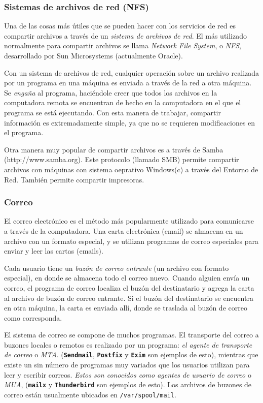 \documentclass[12pt]{article}
\begin{document}
\subsubsection{ Sistemas de archivos de red (NFS)}  

Una de las cosas
más útiles que se pueden hacer con los servicios de red es compartir archivos a
través de un \textit{sistema de archivos de red}. El más utilizado
normalmente para compartir archivos se llama \textit{Network File
System}, o \textit{NFS}, desarrollado por Sun Microsystems (actualmente Oracle).  

 Con un sistema de archivos de red, cualquier operación sobre un archivo
realizada por un programa en una máquina es enviada a través de la red a otra
máquina. Se \textit{engaña} al programa, haciéndole creer que todos los archivos en la
computadora remota se encuentran de hecho en la computadora en el que el programa se
está ejecutando. Con esta manera de trabajar, compartir información es
extremadamente simple, ya que no se requieren modificaciones en el programa.


 Otra manera muy popular de compartir archivos es a través de Samba
(http://www.samba.org). Este protocolo
(llamado SMB) permite compartir archivos con máquinas con sistema oeprativo
Windows(c) a través del Entorno de Red. También permite compartir impresoras.  


\subsubsection{ Correo}

 El correo electrónico es el método más popularmente utilizado para
comunicarse a través de la computadora. Una carta electrónica (email) se almacena en un
archivo con un formato especial, y se utilizan programas de correo especiales
para enviar y leer las cartas (emails).  

 Cada usuario tiene un \textit{buzón de correo entrante} (un
archivo con formato especial), en donde se almacena todo el correo nuevo. Cuando
alguien  envía un correo, el programa de correo localiza el buzón del
destinatario y agrega la carta al archivo de buzón de correo entrante. Si el
buzón del destinatario se encuentra en otra máquina, la carta es enviada allí,
donde se traslada al buzón de correo como corresponda.  

 El sistema de correo se compone de muchos programas. El transporte del
correo a buzones locales o remotos es realizado por un programa: \textit{el
agente de transporte de correo} o \textit{MTA}.
(\texttt{\textbf{Sendmail}}, \texttt{\textbf{Postfix}} y \texttt{\textbf{Exim}} son ejemplos de
esto), mientras que existe un sin número de programas muy variados que los
usuarios utilizan para leer y escribir correos. \textit{Estos son conocidos
como agentes de usuario de correo }o \textit{MUA},
(\texttt{\textbf{mailx}} y \texttt{\textbf{Thunderbird}} son ejemplos de esto). Los
archivos de buzones de correo están usualmente ubicados en
\texttt{/var/spool/mail}.  
\end{document}
